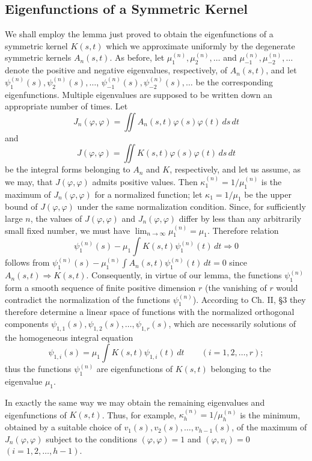 \subsection{Eigenfunctions of a Symmetric Kernel}
We shall employ the lemma just proved to obtain the eigenfunctions of a symmetric kernel $K(s,t)$ which we approximate uniformly by the degenerate symmetric kernels $A_n(s,t)$. As before, let $\mu_1^{(n)},\mu_2^{(n)},\ldots$ and $\mu_{-1}^{(n)},\mu_{-2}^{(n)},\ldots$ denote the positive and negative eigenvalues, respectively, of $A_n(s,t)$, and let $\psi_1^{(n)}(s),\psi_2^{(n)}(s),\ldots$, $\psi_{-1}^{(n)}(s),\psi_{-2}^{(n)}(s),\ldots$ be the corresponding eigenfunctions. Multiple eigenvalues are supposed to be written down an appropriate number of times. Let
\[
J_n(\varphi,\varphi)=\iint A_n(s,t)\varphi(s)\varphi(t)\,ds\,dt
\]
and
\[
J(\varphi,\varphi)=\iint K(s,t)\varphi(s)\varphi(t)\,ds\,dt
\]
be the integral forms belonging to $A_n$ and $K$, respectively, and let us assume, as we may, that $J(\varphi,\varphi)$ admits positive values. Then $\kappa_1^{(n)}=1/\mu_1^{(n)}$ is the maximum of $J_n(\varphi,\varphi)$ for a normalized function; let $\kappa_1=1/\mu_1$ be the upper bound of $J(\varphi,\varphi)$ under the same normalization condition. Since, for sufficiently large $n$, the values of $J(\varphi,\varphi)$ and $J_n(\varphi,\varphi)$ differ by less than any arbitrarily small fixed number, we must have $\lim_{n\to\infty}\mu_1^{(n)}=\mu_1$. Therefore relation
\begin{equation}\tag{83}
\psi_1^{(n)}(s)-\mu_1\int K(s,t)\psi_1^{(n)}(t)\,dt\Rightarrow0
\end{equation}
follows from $\psi_1^{(n)}(s)-\mu_1^{(n)}\int A_n(s,t)\psi_1^{(n)}(t)\,dt=0$ since $A_n(s,t)\Rightarrow K(s,t)$. Consequently, in virtue of our lemma, the functions $\psi_1^{(n)}$ form a smooth sequence of finite positive dimension $r$ (the vanishing of $r$ would contradict the normalization of the functions $\psi_1^{(n)}$). According to Ch. II, \S3 they therefore determine a linear space of functions with the normalized orthogonal components $\psi_{1,1}(s),\psi_{1,2}(s),\ldots,\psi_{1,r}(s)$, which are necessarily solutions of the homogeneous integral equation
\[
\psi_{1,i}(s)=\mu_1\int K(s,t)\psi_{1,i}(t)\,dt
\qquad(i=1,2,\ldots,r);
\]
thus the functions $\psi_1^{(n)}$ are eigenfunctions of $K(s,t)$ belonging to the eigenvalue $\mu_1$.

In exactly the same way we may obtain the remaining eigenvalues and eigenfunctions of $K(s,t)$. Thus, for example, $\kappa_h^{(n)}=1/\mu_h^{(n)}$ is the minimum, obtained by a suitable choice of $v_1(s),v_2(s),\ldots,v_{h-1}(s)$, of the maximum of $J_n(\varphi,\varphi)$ subject to the conditions $(\varphi,\varphi)=1$ and $(\varphi,v_i)=0$ $(i=1,2,\ldots,h-1)$.

